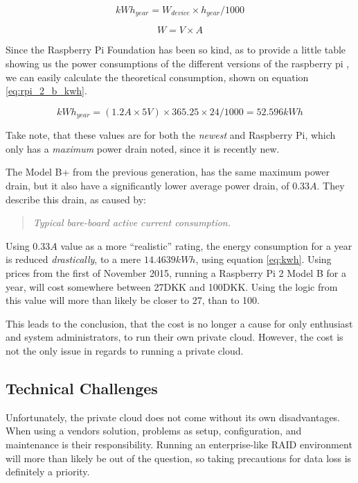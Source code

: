 			\begin{equation}
				kWh_{year} = W_{device} \times h_{year} / 1000
				\label{eq:kwh}
			\end{equation}

			\begin{equation}
				W = V \times A
				\label{eq:w}
			\end{equation}

			Since the Raspberry Pi Foundation has been so kind, as to provide a little table showing us the power consumptions of the different versions of the raspberry pi \cite{raspberrypi_power}, we can easily calculate the theoretical consumption, shown on equation \ref{eq:rpi_2_b_kwh}.

			\begin{equation}
				kWh_{year} = (1.2A \times 5V ) \times 365.25 \times 24 / 1000 = 52.596kWh
				\label{eq:rpi_2_b_kwh}
			\end{equation}

			Take note, that these values are for both the \emph{newest} and Raspberry Pi, which only has a \emph{maximum} power drain noted, since it is recently new. 

			The Model B+ from the previous generation, has the same maximum power drain, but it also have a significantly lower average power drain, of $0.33A$. They describe this drain, as caused by:
			\begin{quote}
				\emph{Typical bare-board active current consumption.}\cite{raspberrypi_power}
			\end{quote}

			Using $0.33A$ value as a more ``realistic'' rating, the energy consumption for a year is reduced \emph{drastically}, to a mere $14.4639 kWh$, using equation \ref{eq:kwh}. Using prices from the first of November 2015\cite{dong_prices}, running a Raspberry Pi 2 Model B for a year, will cost somewhere between 27DKK and 100DKK. Using the logic from \cite{raspberrypi_power} this value will more than likely be closer to 27, than to 100.

			This leads to the conclusion, that the cost is no longer a cause for only enthusiast and system administrators, to run their own private cloud. However, the cost is not the only issue in regards to running a private cloud.


		\subsection*{Technical Challenges}
			Unfortunately, the private cloud does not come without its own disadvantages. When using a vendors solution, problems as setup, configuration, and maintenance is their responsibility. Running an enterprise-like RAID environment will more than likely be out of the question, so taking precautions for data loss is definitely a priority.







